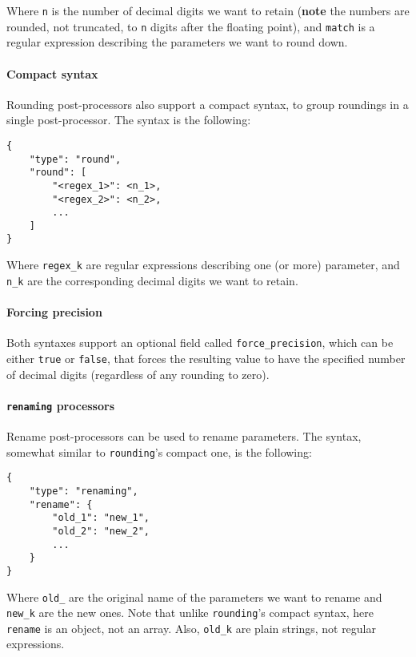 \documentclass[11pt,notitlepage,twoside,a4paper]{article}
\begin{document}
\begin{footnotesize}
\noindent
Where \texttt{n} is the number of decimal digits we want to retain
(\textbf{note} the numbers are rounded, not truncated, to \texttt{n}
digits after the floating point), and \texttt{match} is a regular
expression describing the parameters we want to round down.

\paragraph{Compact syntax} Rounding post-processors also support a compact syntax, to group
roundings in a single post-processor. The syntax is the following:

\begin{lstlisting}
{
    "type": "round",
    "round": [
        "<regex_1>": <n_1>,
        "<regex_2>": <n_2>,
        ...
    ]
}
\end{lstlisting}

\noindent
Where \texttt{regex\_k} are regular expressions describing one (or more)
parameter, and \texttt{n\_k} are the corresponding decimal digits we
want to retain.

\paragraph{Forcing precision} Both syntaxes support an optional field called
\texttt{force\_precision}, which can be either \texttt{true} or
\texttt{false}, that forces the resulting value to have the specified
number of decimal digits (regardless of any rounding to zero).

\paragraph{\texttt{renaming} processors}

Rename post-processors can be used to rename parameters. The syntax,
somewhat similar to \texttt{rounding}'s compact one, is the following:

\begin{lstlisting}
{
    "type": "renaming",
    "rename": {
        "old_1": "new_1",
        "old_2": "new_2",
        ...
    }
}
\end{lstlisting}

\noindent
Where \texttt{old\_} are the original name of the parameters we want to
rename and \texttt{new\_k} are the new ones. Note that unlike
\texttt{rounding}'s compact syntax, here \texttt{rename} is an object,
not an array. Also, \texttt{old\_k} are plain strings, not regular
expressions.


\end{footnotesize}
\end{document}
